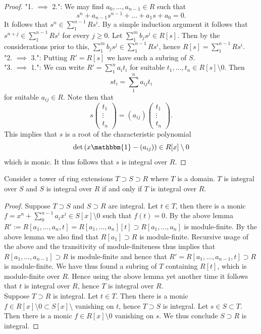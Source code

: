\begin{proof}
    "1. $\implies$ 2.": We may find $a_0,\dots,a_{n-1}\in R$ such that 
    $$s^n+a_{n-1}s^{n-1}+\dots+ a_1s+ a_0 = 0.$$
    It follows that $s^n \in \sum_1^{n-1} Rs^i$. By a simple induction argument it follows that $s^{n+j}\in \sum_1^{n-1} Rs^i$ for every $j\geq 0$. Let $\sum_1^m b_js^j\in R[s]$. Then by the considerations prior to this, $\sum_1^m b_js^j\in \sum_1^{n-1} Rs^i$, hence $R[s]=\sum_1^{n-1} Rs^{i}$.\\
    "2. $\implies$ 3.": Putting $R' = R[s]$ we have such a subring of $S$.\\
    "3. $\implies$ 1.": We can write $R'=\sum_1^n a_it_i$ for suitable $t_1,\dots,t_n\in R[s]\setminus 0$. Then 
    $$st_i = \sum_1^n a_{ij}t_i$$
    for suitable $a_{ij}\in R$. Note then that 
    $$s\begin{pmatrix} t_1\\ \vdots \\ t_n\end{pmatrix} = (a_{ij}) \begin{pmatrix} t_1\\ \vdots \\ t_n\end{pmatrix}.$$
    This implies that $s$ is a root of the characteristic polynomial 
    $$\det\left( x\mathbbm{1} - (a_{ij})\right) \in R[x]\setminus 0$$
    which is monic. It thus follows that $s$ is integral over $R$. 
\end{proof}
\begin{lemma}\label{TransitivityOfIntegralExtensions}
    Consider a tower of ring extensions $T\supset S\supset R$ where $T$ is a domain. $T$ is integral over $S$ and $S$ is integral over $R$ if and only if $T$ is integral over $R$. 
\end{lemma}
\begin{proof}
    Suppose $T\supset S$ and $S\supset R$ are integral. Let $t\in T$, then there is a monic $f=x^n+\sum_0^{n-1} a_ix^i\in S[x]\setminus 0$ such that $f(t)=0$. By the above lemma $R' := R[a_1,\dots,a_n,t]=R[a_1,\dots,a_n][t] \supset R[a_1,\dots,a_n]$ is module-finite. By the above lemma we also find that $R[a_1]\supset R$ is module-finite. Recursive usage of the above and the transitivity of module-finiteness thus implies that $R[a_1,\dots,a_{n-1}]\supset R$ is module-finite and hence that $R' = R[a_1,\dots,a_{n-1},t]\supset R$ is module-finite. We have thus found a subring of $T$ containing $R[t]$, which is module-finite over $R$. Hence using the above lemma yet another time it follows that $t$ is integral over $R$, hence $T$ is integral over $R$.\\
    Suppose $T\supset R$ is integral. Let $t\in T$. Then there is a monic $f\in R[x]\setminus 0 \subset S[x]\setminus $ vanishing on $t$, hence $T\supset S$ is integral. Let $s\in S\subset T$. Then there is a monic $f\in R[x]\setminus 0$ vanishing on $s$. We thus conclude $S\supset R$ is integral. 
\end{proof}

